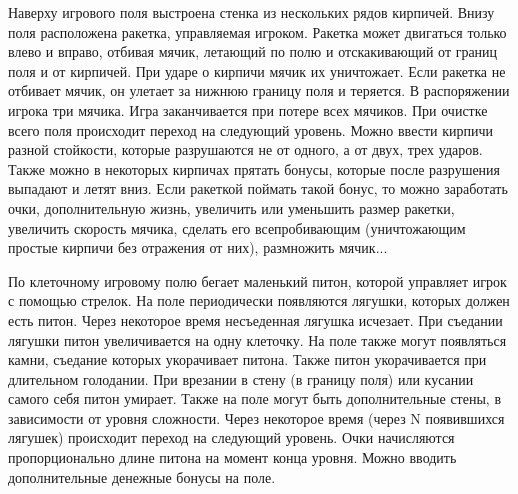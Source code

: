 
\begin{zztask}[Arcanoid]
Наверху игрового поля выстроена стенка из нескольких рядов кирпичей. Внизу
поля расположена ракетка, управляемая игроком. Ракетка может двигаться только
влево и вправо, отбивая мячик, летающий по полю и отскакивающий от границ поля
и от кирпичей. При ударе о кирпичи мячик их уничтожает. Если ракетка не
отбивает мячик, он улетает за нижнюю границу поля и теряется. В распоряжении
игрока три мячика. Игра заканчивается при потере всех мячиков. При очистке
всего поля происходит переход на следующий уровень. Можно ввести кирпичи
разной стойкости, которые разрушаются не от одного, а от двух, трех ударов.
Также можно в некоторых кирпичах прятать бонусы, которые после разрушения
выпадают и летят вниз. Если ракеткой поймать такой бонус, то можно заработать
очки, дополнительную жизнь, увеличить или уменьшить размер ракетки, увеличить
скорость мячика, сделать его всепробивающим (уничтожающим простые кирпичи без
отражения от них), размножить мячик...
\end{zztask}


\begin{zztask}[Snake]
По клеточному игровому полю бегает маленький питон, которой управляет игрок с
помощью стрелок. На поле периодически появляются лягушки, которых должен есть
питон. Через некоторое время несъеденная лягушка исчезает. При съедании
лягушки питон увеличивается на одну клеточку. На поле также могут появляться
камни, съедание которых укорачивает питона. Также питон укорачивается при
длительном голодании. При врезании в стену (в границу поля) или кусании самого
себя питон умирает. Также на поле могут быть дополнительные стены, в
зависимости от уровня сложности. Через некоторое время (через N появившихся
лягушек) происходит переход на следующий уровень. Очки начисляются
пропорционально длине питона на момент конца уровня. Можно вводить
дополнительные денежные бонусы на поле.
\end{zztask}

